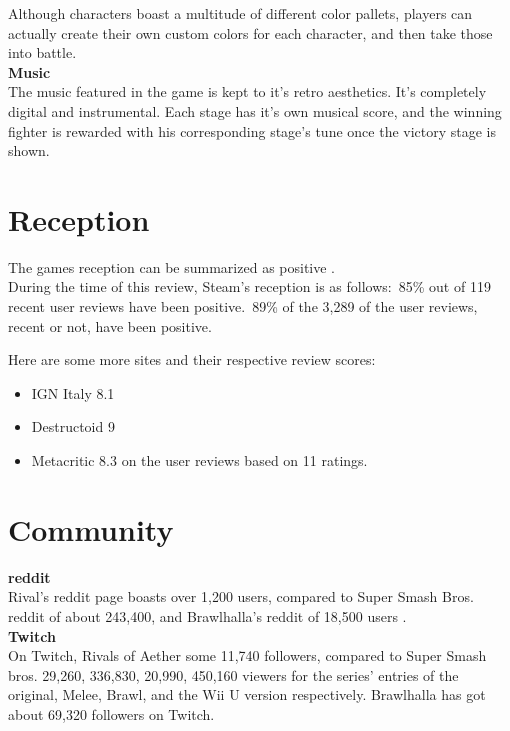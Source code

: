 \documentclass{article}
\begin{document}
Although characters boast a multitude of different color pallets, players can actually create their own custom colors for each character, and then take those into battle.\\

\textbf{Music}\\
The music featured in the game is kept to it's retro aesthetics. It's completely digital and instrumental. Each stage has it's own musical score, and the winning fighter is rewarded with his corresponding stage's tune once the victory stage is shown.\\


\chapter{Reception}


The games reception can be summarized as positive \cite{steam:6}.\\
During the time of this review, Steam's reception is as follows:\
85\% out of 119 recent user reviews have been positive.\
89\% of the 3,289 of the user reviews, recent or not, have been positive.\


Here are some more sites and their respective review scores: \cite{metacritic:7} %

\begin{itemize}
\item IGN Italy 8.1
\item Destructoid 9
\item Metacritic 8.3 on the user reviews based on 11 ratings.
\end{itemize}

\chapter{Community}

\textbf{reddit}\\
Rival's reddit page boasts over 1,200 users, compared to Super Smash Bros. reddit of about 243,400, and Brawlhalla's reddit of 18,500 users \cite{reddit:4}.\\

\textbf{Twitch}\\
On Twitch, Rivals of Aether some 11,740 followers, compared to Super Smash bros. 29,260, 336,830, 20,990, 450,160 viewers for the series' entries of the original, Melee, Brawl, and the Wii U version respectively. Brawlhalla has got about 69,320 followers on Twitch. \cite{twitch:5}\\
\end{document}
